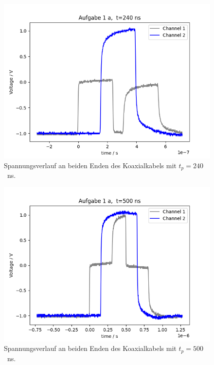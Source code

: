 \documentclass{article}
\begin{document}
\begin{figure}[H]
\centering
\caption{Spannungsverlauf an beiden Enden des Koaxialkabels mit $t_p=240$~ns.}
\label{fig:task1a_240ns}
\includegraphics[scale=0.6]{bilder/task1a/task1a_240ns.png}
\end{figure}

\begin{figure}[H]
\centering
\caption{Spannungsverlauf an beiden Enden des Koaxialkabels mit $t_p=500$~ns.}
\label{fig:task1a_500ns}
\includegraphics[scale=0.6]{bilder/task1a/task1a_500ns.png}
\end{figure}
\end{document}
